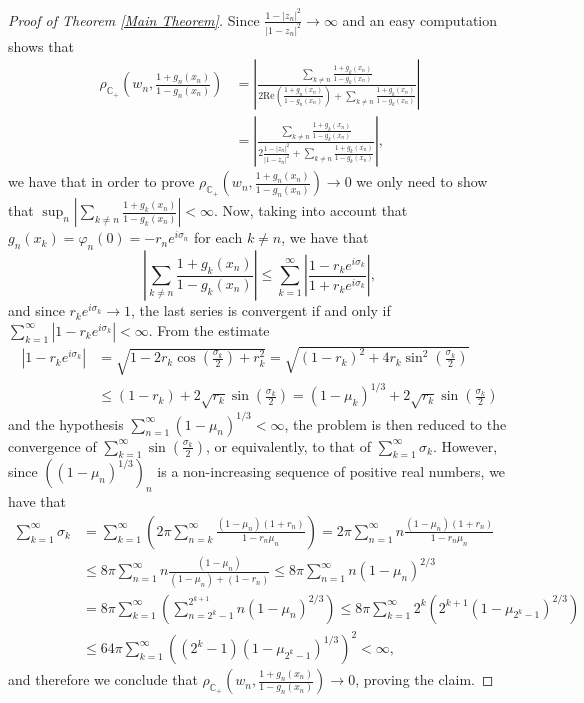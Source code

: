 \documentclass[preprint,12pt,number]{elsarticle}
\newcommand{\C}{\mathbb{C}}
\begin{document}
\begin{proof}[Proof of Theorem \ref{Main Theorem}]
   Since $\frac{1-|z_n|^2}{|1-z_n|^2}\rightarrow\infty$ and an easy computation shows that 
   \[
   \begin{aligned}
   \rho_{\C_+}\left(w_n,\frac{1+g_n(x_n)}{1-g_n(x_n)}\right) &=\left|\frac{\sum_{k\neq n}\frac{1+g_k(x_n)}{1-g_k(x_n)}}{2\text{Re}\left(\frac{1+g_n(x_n)}{1-g_n(x_n)}\right) +\sum_{k\neq n}\frac{1+g_k(x_n)}{1-g_k(x_n)}} \right| \\
   &=\left|\frac{\sum_{k\neq n}\frac{1+g_k(x_n)}{1-g_k(x_n)}}{2\frac{1-|z_n|^2}{|1-z_n|^2} +\sum_{k\neq n}\frac{1+g_k(x_n)}{1-g_k(x_n)}} \right|,
   \end{aligned}
   \] 
   we have that in order to prove $\rho_{\C_+}\left(w_n,\frac{1+g_n(x_n)}{1-g_n(x_n)}\right)\rightarrow0$ we only need to show that $\sup_n\left|\sum_{k\neq n}\frac{1+g_k(x_n)}{1-g_k(x_n)}\right|<\infty$. Now, taking into account that $g_n(x_k)=\varphi_n(0)=-r_ne^{i\sigma_n}$ for each $k\neq n$, we have that $$\left|\sum_{k\neq n}\frac{1+g_k(x_n)}{1-g_k(x_n)}\right|\leq \sum_{k=1}^\infty \left|\frac{1-r_ke^{i\sigma_k}}{1+r_ke^{i\sigma_k}}\right|,$$ and since $r_ke^{i\sigma_k}\rightarrow1$, the last series is convergent if and only if $\sum_{k=1}^\infty|1-r_ke^{i\sigma_k}|<\infty$. From the estimate 
   \[
   \begin{aligned}
   |1-r_ke^{i\sigma_k}| &=\sqrt{1-2r_k\cos\left(\frac{\sigma_k}{2}\right)+r_k^2}=\sqrt{(1-r_k)^2+4r_k\sin^2\left(\frac{\sigma_k}{2}\right)} \\
   &\leq (1-r_k)+2\sqrt{r_k}\sin\left(\frac{\sigma_k}{2}\right)=(1-\mu_k)^{1/3}+2\sqrt{r_k}\sin\left(\frac{\sigma_k}{2}\right)
   \end{aligned}
   \] 
   and the hypothesis $\sum_{n=1}^\infty(1-\mu_n)^{1/3}<\infty$, the problem is then reduced to the convergence of $\sum_{k=1}^\infty \sin\left(\frac{\sigma_k}{2}\right)$, or equivalently, to that of $\sum_{k=1}^\infty \sigma_k$. However, since $((1-\mu_n)^{1/3})_n$ is a non-increasing sequence of positive real numbers, we have that 
   \[
   \begin{aligned}
   \sum_{k=1}^\infty \sigma_k &=\sum_{k=1}^\infty\left(2\pi\sum_{n=k}^\infty\frac{(1-\mu_n)(1+r_n)}{1-r_n\mu_n}\right)=2\pi\sum_{n=1}^\infty n\frac{(1-\mu_n)(1+r_n)}{1-r_n\mu_n} \\
   &\leq 8\pi\sum_{n=1}^\infty n\frac{(1-\mu_n)}{(1-\mu_n)+(1-r_n)}\leq 8\pi\sum_{n=1}^\infty n(1-\mu_n)^{2/3} \\
   &=8\pi\sum_{k=1}^\infty\left(\sum_{n=2^k-1}^{2^{k+1}} n(1-\mu_n)^{2/3}\right)\leq 8\pi\sum_{k=1}^\infty 2^k\left( 2^{k+1} (1-\mu_{2^k-1})^{2/3}\right) \\
   &\leq 64\pi\sum_{k=1}^\infty\left( (2^{k}-1) (1-\mu_{2^k-1})^{1/3}\right)^2<\infty,
   \end{aligned}
   \] 
   and therefore we conclude that $\rho_{\C_+}\left(w_n,\frac{1+g_n(x_n)}{1-g_n(x_n)}\right)\rightarrow0$, proving the claim. 


\end{proof}
\end{document}
